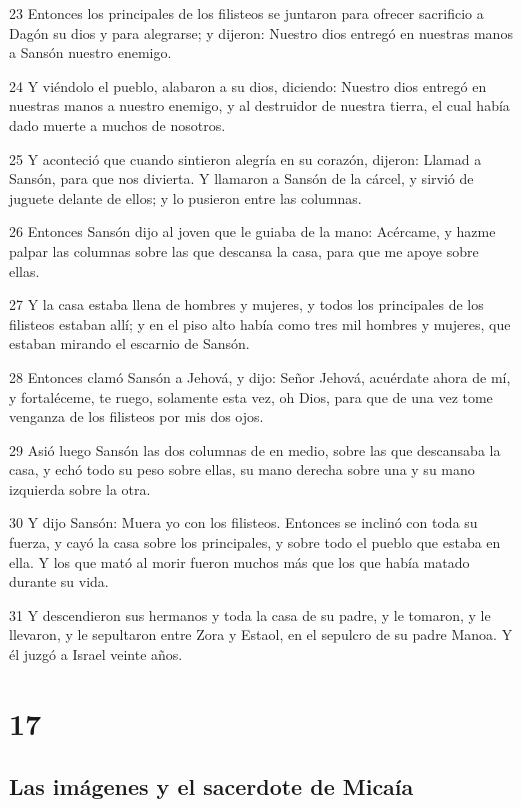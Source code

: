 \par 23 Entonces los principales de los filisteos se juntaron para ofrecer sacrificio a Dagón su dios y para alegrarse; y dijeron: Nuestro dios entregó en nuestras manos a Sansón nuestro enemigo.
\par 24 Y viéndolo el pueblo, alabaron a su dios, diciendo: Nuestro dios entregó en nuestras manos a nuestro enemigo, y al destruidor de nuestra tierra, el cual había dado muerte a muchos de nosotros. 
\par 25 Y aconteció que cuando sintieron alegría en su corazón, dijeron: Llamad a Sansón, para que nos divierta. Y llamaron a Sansón de la cárcel, y sirvió de juguete delante de ellos; y lo pusieron entre las columnas.
\par 26 Entonces Sansón dijo al joven que le guiaba de la mano: Acércame, y hazme palpar las columnas sobre las que descansa la casa, para que me apoye sobre ellas.
\par 27 Y la casa estaba llena de hombres y mujeres, y todos los principales de los filisteos estaban allí; y en el piso alto había como tres mil hombres y mujeres, que estaban mirando el escarnio de Sansón.
\par 28 Entonces clamó Sansón a Jehová, y dijo: Señor Jehová, acuérdate ahora de mí, y fortaléceme, te ruego, solamente esta vez, oh Dios, para que de una vez tome venganza de los filisteos por mis dos ojos.
\par 29 Asió luego Sansón las dos columnas de en medio, sobre las que descansaba la casa, y echó todo su peso sobre ellas, su mano derecha sobre una y su mano izquierda sobre la otra.
\par 30 Y dijo Sansón: Muera yo con los filisteos. Entonces se inclinó con toda su fuerza, y cayó la casa sobre los principales, y sobre todo el pueblo que estaba en ella. Y los que mató al morir fueron muchos más que los que había matado durante su vida.
\par 31 Y descendieron sus hermanos y toda la casa de su padre, y le tomaron, y le llevaron, y le sepultaron entre Zora y Estaol, en el sepulcro de su padre Manoa. Y él juzgó a Israel veinte años.

\chapter{17}

\section*{Las imágenes y el sacerdote de Micaía}

